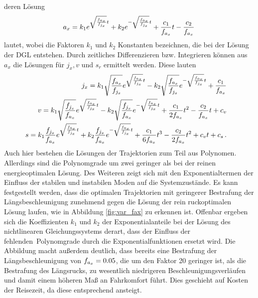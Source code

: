 deren Lösung
\begin{equation}
a_x = k_1e^{\sqrt{\frac{f_{a_x}}{f_{j_x}}}t} + k_2e^{-\sqrt{\frac{f_{a_x}}{f_{j_x}}}t} + \frac{c_1}{f_{a_x}}t - \frac{c_2}{f_{a_x}} \, \label{eq:DGL_ax_Lösung}
\end{equation}
lautet, wobei die Faktoren $k_1$ und $k_2$ Konstanten bezeichnen, die bei der Lösung der \gls{DGL} entstehen. Durch zeitliches Differenzieren bzw. Integrieren können aus $a_x$ die Lösungen für $j_x, v$ und $s_r$ ermittelt werden. Diese lauten
\begin{align}
\begin{split}
j_x &= k_1\sqrt{\frac{f_{a_x}}{f_{j_x}}}e^{\sqrt{\frac{f_{a_x}}{f_{j_x}}}t} - k_2\sqrt{\frac{f_{a_x}}{f_{j_x}}}e^{-\sqrt{\frac{f_{a_x}}{f_{j_x}}}t} + \frac{c_1}{f_{a_x}} \label{eq:DGL_jx_Lösung}
\end{split}
\\
\begin{split}
v &= k_1\sqrt{\frac{f_{j_x}}{f_{a_x}}}e^{\sqrt{\frac{f_{a_x}}{f_{j_x}}}t} - k_2\sqrt{\frac{f_{j_x}}{f_{a_x}}}e^{-\sqrt{\frac{f_{a_x}}{f_{j_x}}}t} + \frac{c_1}{2f_{a_x}}t^2 - \frac{c_2}{f_{a_x}}t + c_v
\end{split}
\\
\begin{split}
s &= k_1\frac{f_{j_x}}{f_{a_x}}e^{\sqrt{\frac{f_{a_x}}{f_{j_x}}}t} + k_2\frac{f_{j_x}}{f_{a_x}}e^{-\sqrt{\frac{f_{a_x}}{f_{j_x}}}t} + \frac{c_1}{6f_{a_x}}t^3 - \frac{c_2}{2f_{a_x}}t^2 + c_vt + c_s \,.
\end{split}
\end{align}
Auch hier bestehen die Lösungen der Trajektorien zum Teil aus Polynomen. Allerdings sind die Polynomgrade um zwei geringer als bei der reinen energieoptimalen Lösung. Des Weiteren zeigt sich mit den Exponentialtermen der Einfluss der stabilen und instabilen Moden auf die Systemzustände. Es kann festgestellt werden, dass die optimalen Trajektorien mit geringerer Bestrafung der Längsbeschleunigung zunehmend gegen die Lösung der rein ruckoptimalen Lösung laufen, wie in Abbildung \ref{fig:var_fax} zu erkennen ist. Offenbar ergeben sich die Koeffizienten $k_1$ und $k_2$ der Exponentialanteile bei der Lösung des nichtlinearen Gleichungssystems derart, dass der Einfluss der \glqq fehlenden\grqq~Polynomgrade durch die Exponentialfunktionen ersetzt wird. Die Abbildung macht außerdem deutlich, dass bereits eine Bestrafung der Längsbeschleunigung von $f_{a_x} = 0.05$, die um den Faktor 20 geringer ist, als die Bestrafung des Längsrucks, zu wesentlich niedrigeren Beschleunigungsverläufen und damit einem höheren Maß an Fahrkomfort führt. Dies geschieht auf Kosten der Reisezeit, da diese entsprechend ansteigt. 
